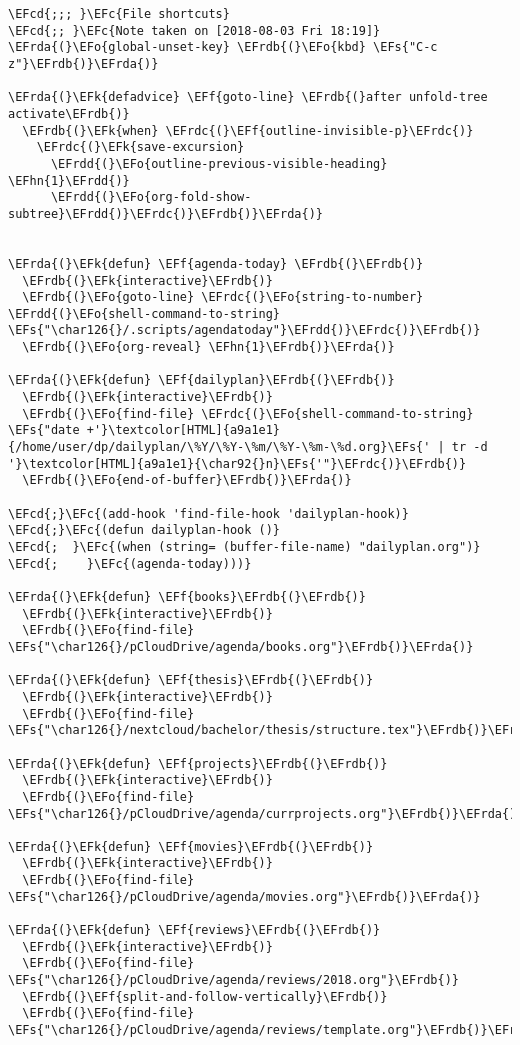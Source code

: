 \documentclass[a4wide,10pt]{article}
\newcommand{\EFc}[1]{\textcolor{EFc}{#1}} %
\newcommand{\EFcd}[1]{\textcolor{EFcd}{#1}} %
\newcommand{\EFs}[1]{\textcolor{EFs}{#1}} %
\newcommand{\EFk}[1]{\textcolor{EFk}{#1}} %
\newcommand{\EFf}[1]{\textcolor{EFf}{#1}} %
\newcommand{\EFo}[1]{\textcolor{EFo}{#1}} %
\newcommand{\EFhn}[1]{\textcolor{EFhn}{\textbf{#1}}} %
\newcommand{\EFrda}[1]{\textcolor{EFrda}{#1}} %
\newcommand{\EFrdb}[1]{\textcolor{EFrdb}{#1}} %
\newcommand{\EFrdc}[1]{\textcolor{EFrdc}{#1}} %
\newcommand{\EFrdd}[1]{\textcolor{EFrdd}{#1}} %
\begin{document}
\begin{Code}
\begin{Verbatim}
\EFcd{;;; }\EFc{File shortcuts}
\EFcd{;; }\EFc{Note taken on [2018-08-03 Fri 18:19]}
\EFrda{(}\EFo{global-unset-key} \EFrdb{(}\EFo{kbd} \EFs{"C-c z"}\EFrdb{)}\EFrda{)}

\EFrda{(}\EFk{defadvice} \EFf{goto-line} \EFrdb{(}after unfold-tree activate\EFrdb{)}
  \EFrdb{(}\EFk{when} \EFrdc{(}\EFf{outline-invisible-p}\EFrdc{)}
    \EFrdc{(}\EFk{save-excursion}
      \EFrdd{(}\EFo{outline-previous-visible-heading} \EFhn{1}\EFrdd{)}
      \EFrdd{(}\EFo{org-fold-show-subtree}\EFrdd{)}\EFrdc{)}\EFrdb{)}\EFrda{)}


\EFrda{(}\EFk{defun} \EFf{agenda-today} \EFrdb{(}\EFrdb{)}
  \EFrdb{(}\EFk{interactive}\EFrdb{)}
  \EFrdb{(}\EFo{goto-line} \EFrdc{(}\EFo{string-to-number} \EFrdd{(}\EFo{shell-command-to-string} \EFs{"\char126{}/.scripts/agendatoday"}\EFrdd{)}\EFrdc{)}\EFrdb{)}
  \EFrdb{(}\EFo{org-reveal} \EFhn{1}\EFrdb{)}\EFrda{)}

\EFrda{(}\EFk{defun} \EFf{dailyplan}\EFrdb{(}\EFrdb{)}
  \EFrdb{(}\EFk{interactive}\EFrdb{)}
  \EFrdb{(}\EFo{find-file} \EFrdc{(}\EFo{shell-command-to-string} \EFs{"date +'}\textcolor[HTML]{a9a1e1}{/home/user/dp/dailyplan/\%Y/\%Y-\%m/\%Y-\%m-\%d.org}\EFs{' | tr -d '}\textcolor[HTML]{a9a1e1}{\char92{}n}\EFs{'"}\EFrdc{)}\EFrdb{)}
  \EFrdb{(}\EFo{end-of-buffer}\EFrdb{)}\EFrda{)}

\EFcd{;}\EFc{(add-hook 'find-file-hook 'dailyplan-hook)}
\EFcd{;}\EFc{(defun dailyplan-hook ()}
\EFcd{;  }\EFc{(when (string= (buffer-file-name) "dailyplan.org")}
\EFcd{;    }\EFc{(agenda-today)))}

\EFrda{(}\EFk{defun} \EFf{books}\EFrdb{(}\EFrdb{)}
  \EFrdb{(}\EFk{interactive}\EFrdb{)}
  \EFrdb{(}\EFo{find-file} \EFs{"\char126{}/pCloudDrive/agenda/books.org"}\EFrdb{)}\EFrda{)}

\EFrda{(}\EFk{defun} \EFf{thesis}\EFrdb{(}\EFrdb{)}
  \EFrdb{(}\EFk{interactive}\EFrdb{)}
  \EFrdb{(}\EFo{find-file} \EFs{"\char126{}/nextcloud/bachelor/thesis/structure.tex"}\EFrdb{)}\EFrda{)}

\EFrda{(}\EFk{defun} \EFf{projects}\EFrdb{(}\EFrdb{)}
  \EFrdb{(}\EFk{interactive}\EFrdb{)}
  \EFrdb{(}\EFo{find-file} \EFs{"\char126{}/pCloudDrive/agenda/currprojects.org"}\EFrdb{)}\EFrda{)}

\EFrda{(}\EFk{defun} \EFf{movies}\EFrdb{(}\EFrdb{)}
  \EFrdb{(}\EFk{interactive}\EFrdb{)}
  \EFrdb{(}\EFo{find-file} \EFs{"\char126{}/pCloudDrive/agenda/movies.org"}\EFrdb{)}\EFrda{)}

\EFrda{(}\EFk{defun} \EFf{reviews}\EFrdb{(}\EFrdb{)}
  \EFrdb{(}\EFk{interactive}\EFrdb{)}
  \EFrdb{(}\EFo{find-file} \EFs{"\char126{}/pCloudDrive/agenda/reviews/2018.org"}\EFrdb{)}
  \EFrdb{(}\EFf{split-and-follow-vertically}\EFrdb{)}
  \EFrdb{(}\EFo{find-file} \EFs{"\char126{}/pCloudDrive/agenda/reviews/template.org"}\EFrdb{)}\EFrda{)}


\end{Verbatim}
\end{Code}
\end{document}
